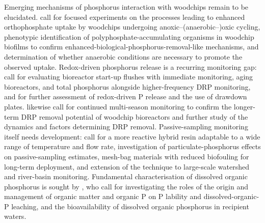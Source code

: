 \documentclass[11pt]{article}
\begin{document}
Emerging mechanisms of phosphorus interaction with woodchips remain to be elucidated. \textcite{Zhang2024b} call for focused experiments on the processes leading to enhanced orthophosphate uptake by woodchips undergoing anoxic--(anaerobic--)oxic cycling, phenotypic identification of polyphosphate-accumulating organisms in woodchip biofilms to confirm enhanced-biological-phosphorus-removal-like mechanisms, and determination of whether anaerobic conditions are necessary to promote the observed uptake. Redox-driven phosphorus release is a recurring monitoring gap: \textcite{Bailon2025} call for evaluating bioreactor start-up flushes with immediate monitoring, aging bioreactors, and total phosphorus alongside higher-frequency DRP monitoring, and for further assessment of redox-driven P release and the use of drawdown plates. \textcite{Rivas2020} likewise call for continued multi-season monitoring to confirm the longer-term DRP removal potential of woodchip bioreactors and further study of the dynamics and factors determining DRP removal. Passive-sampling monitoring itself needs development: \textcite{Li2020b} call for a more reactive hybrid resin adaptable to a wide range of temperature and flow rate, investigation of particulate-phosphorus effects on passive-sampling estimates, mesh-bag materials with reduced biofouling for long-term deployment, and extension of the technique to large-scale watershed and river-basin monitoring. Fundamental characterisation of dissolved organic phosphorus is sought by \textcite{Liu2024b}, who call for investigating the roles of the origin and management of organic matter and organic P on P lability and dissolved-organic-P leaching, and the bioavailability of dissolved organic phosphorus in recipient waters.
\end{document}
